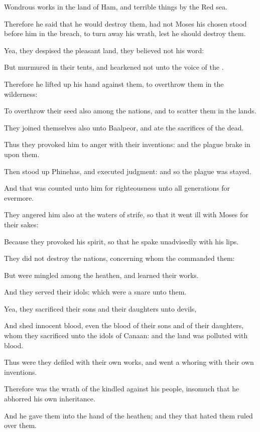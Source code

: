 \verse Wondrous works in the land of Ham, and terrible things by the Red sea.

\verse Therefore he said that he would destroy them, had not Moses his chosen stood before him in the breach, to turn away his wrath, lest he should destroy them.

\verse Yea, they despised the pleasant land, they believed not his word:

\verse But murmured in their tents, and hearkened not unto the voice of the \LORD.

\verse Therefore he lifted up his hand against them, to overthrow them in the wilderness:

\verse To overthrow their seed also among the nations, and to scatter them in the lands.

\verse They joined themselves also unto Baalpeor, and ate the sacrifices of the dead.

\verse Thus they provoked him to anger with their inventions: and the plague brake in upon them.

\verse Then stood up Phinehas, and executed judgment: and so the plague was stayed.

\verse And that was counted unto him for righteousness unto all generations for evermore.

\verse They angered him also at the waters of strife, so that it went ill with Moses for their sakes:

\verse Because they provoked his spirit, so that he spake unadvisedly with his lips.

\verse They did not destroy the nations, concerning whom the \LORD commanded them:

\verse But were mingled among the heathen, and learned their works.

\verse And they served their idols: which were a snare unto them.

\verse Yea, they sacrificed their sons and their daughters unto devils,

\verse And shed innocent blood, even the blood of their sons and of their daughters, whom they sacrificed unto the idols of Canaan: and the land was polluted with blood.

\verse Thus were they defiled with their own works, and went a whoring with their own inventions.

\verse Therefore was the wrath of the \LORD kindled against his people, insomuch that he abhorred his own inheritance.

\verse And he gave them into the hand of the heathen; and they that hated them ruled over them.

